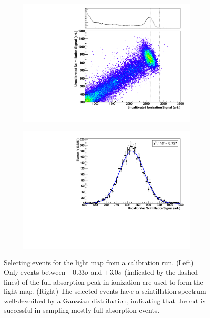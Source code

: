 \documentclass[herrin-thesis.tex]{subfiles}
\begin{document}
\begin{figure}[htbp]
\centering
\begin{subfigure}[b]{0.48\textwidth}
\centering
\includegraphics[width=\textwidth]{./plots/lightmap_ionization_cut.pdf}
\end{subfigure}\hfill%
\begin{subfigure}[b]{0.48\textwidth}
\centering
\includegraphics[width=\textwidth]{./plots/lightmap_scintillation_post_cut.pdf}
\end{subfigure}
\caption[Event selection for the light map]{Selecting events for the light map from a  calibration run. (Left) Only events between \(+0.33\sigma\) and \(+3.0\sigma\) (indicated by the dashed lines) of the full-absorption peak in ionization are used to form the light map. (Right) The selected events have a scintillation spectrum well-described by a Gaussian distribution, indicating that the cut is successful in sampling mostly full-absorption events.}
\label{fig:lightmap_event_selection}
\end{figure}
\end{document}
